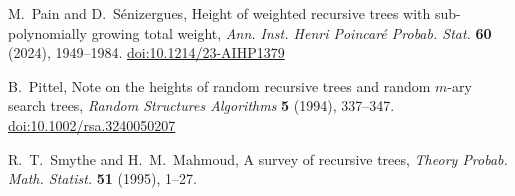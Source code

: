  M.~Pain and D.~S\'enizergues, Height of weighted recursive trees with sub-polynomially growing total
weight, \emph{Ann. Inst. Henri Poincar\'e Probab. Stat.} \textbf{60} (2024), 1949--1984.
\href{https://doi.org/10.1214/23-AIHP1379}{doi:10.1214/23-AIHP1379}

 B.~Pittel, Note on the heights of random recursive trees and random $m$-ary search trees,
\emph{Random Structures Algorithms} \textbf{5} (1994), 337--347.
\href{https://doi.org/10.1002/rsa.3240050207}{doi:10.1002/rsa.3240050207}

 R.~T.~Smythe and H.~M.~Mahmoud, A survey of recursive trees,
\emph{Theory Probab. Math. Statist.} \textbf{51} (1995), 1--27.
